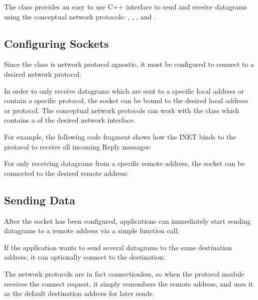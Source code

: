 The  class provides an easy to use C++ interface to send and
receive datagrams using the conceptual network protocols:
, ,
, and .

\subsection*{Configuring Sockets}

Since the  class is network protocol agnostic, it must be
configured to connect to a desired network protocol:


In order to only receive datagrams which are sent to a specific local address or
contain a specific protocol, the socket can be bound to the desired local
address or protocol. The conceptual network protocols can work with the
 class which contains a  of the desired
network interface.

For example, the following code fragment shows how the INET 
binds to the  protocol to receive all incoming 
Reply messages:


For only receiving datagrams from a specific remote address, the socket can be
connected to the desired remote address:


\subsection*{Sending Data}

After the socket has been configured, applications can immediately start sending
datagrams to a remote address via a simple function call:


If the application wants to send several datagrams to the same destination
address, it can optionally connect to the destination:


The network protocols are in fact connectionless, so when the protocol module
receives the connect request, it simply remembers the remote address, and uses
it as the default destination address for later sends.

